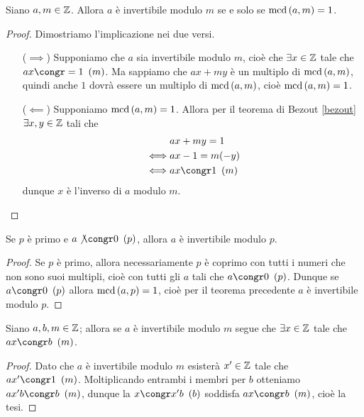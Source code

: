 \begin{theorem}\label{invertibilita_mod_m}
    Siano $a, m \in \mathbb{Z}$. Allora $a$ è invertibile modulo $m$ se e solo se $\operatorname{mcd}\left(a, m\right) = 1$. 
\end{theorem}
\begin{proof}
    Dimostriamo l'implicazione nei due versi.
    \begin{itemize}
        \item[($\implies$)] Supponiamo che $a$ sia invertibile modulo $m$, cioè che $\exists x \in \mathbb{Z}$ tale che $ax \congr= 1 \Mod{m}$. Ma sappiamo che $ax + my$ è un multiplo di $\operatorname{mcd}\left(a, m\right)$, quindi anche $1$ dovrà essere un multiplo di $\operatorname{mcd}\left(a, m\right)$, cioè $\operatorname{mcd}\left(a, m\right) = 1$.
        \item[($\impliedby$)] Supponiamo $\operatorname{mcd}\left(a, m\right) = 1$. Allora per il teorema di Bezout \ref{bezout} $\exists x, y \in \mathbb{Z}$ tali che
        \begin{alignat*}{1}
            &ax + my = 1 \\
            \iff &ax - 1 = m(-y) \\
            \iff &ax \congr 1 \Mod{m}
        \end{alignat*}
        dunque $x$ è l'inverso di $a$ modulo $m$. \qedhere
    \end{itemize}
\end{proof}

\begin{corollary}
    Se $p$ è primo e $a \not\congr 0 \Mod{p}$, allora $a$ è invertibile modulo $p$.
\end{corollary}
\begin{proof}
    Se $p$ è primo, allora necessariamente $p$ è coprimo con tutti i numeri che non sono suoi multipli, cioè con tutti gli $a$ tali che $a \congr 0 \Mod{p}$. Dunque se $a \congr 0 \Mod{p}$ allora $\operatorname{mcd}\left(a, p\right) = 1$, cioè per il teorema precedente $a$ è invertibile modulo $p$.
\end{proof}

\begin{proposition} \label{se_invertibile_allora_soluzione}
    Siano $a, b, m \in \mathbb{Z}$; allora se $a$ è invertibile modulo $m$ segue che $\exists x \in \mathbb{Z}$ tale che $ax \congr b \Mod{m}$.
\end{proposition}
\begin{proof}
    Dato che $a$ è invertibile modulo $m$ esisterà $x^\prime \in \mathbb{Z}$ tale che $ax^\prime \congr 1 \Mod{m}$. Moltiplicando entrambi i membri per $b$ otteniamo $ax'b \congr b \Mod{m}$, dunque la $x \congr x'b \Mod{b}$ soddisfa $ax \congr b \Mod{m}$, cioè la tesi.
\end{proof}

